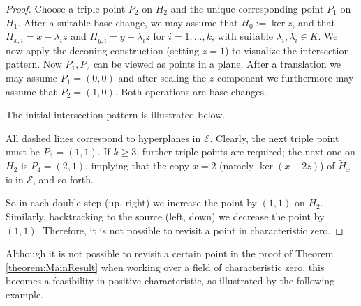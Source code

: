 \documentclass[12pt]{amsart}
\theoremstyle{definition}
\theoremstyle{remark}
\newcommand\CE{{\mathscr E}}
\begin{document}
\begin{proof}
Choose a triple point $P_2$ on $H_2$ and the unique corresponding point $P_1$ on $H_1$. After a suitable base change, we may assume that $H_0 := \ker z$, and that 
$H_{x,i} = x - \lambda_i z$ and $H_{y,i} = y - \tilde \lambda_i z$ for $i=1,\ldots,k$, with suitable $\lambda_i,\tilde \lambda_i \in K$. We now apply the deconing construction (setting $z=1$) to visualize the intersection pattern. Now $P_1,P_2$ can be viewed as points in a plane. After a translation we may assume $P_1 =(0,0)$ and after scaling the $z$-component we furthermore may assume that $P_2 = (1,0)$. Both operations are base changes.

The initial intersection pattern is illustrated below.

\begin{center}
\end{center}

All dashed lines correspond to hyperplanes in $\CE$. Clearly, the next triple point must be $P_3 = (1,1)$. If $k\geq 3$, further triple points are required; the next one on $H_2$ is $P_4 = (2,1)$, implying that the copy $x = 2$ (namely $\ker (x-2z)$) of $\tilde H_x$ is in $\CE$, and so forth.

So in each double step (up, right) we increase the point by $(1,1)$ on $H_2$. Similarly, backtracking to the source (left, down) we decrease the point by $(1,1)$. Therefore, it is not possible to revisit a point in characteristic zero.
\end{proof}

Although it is not possible to revisit a certain point in the proof of Theorem \ref{theorem:MainResult} when working over a field of characteristic zero, this becomes a feasibility in positive characteristic, as illustrated by the following example.
\end{document}
